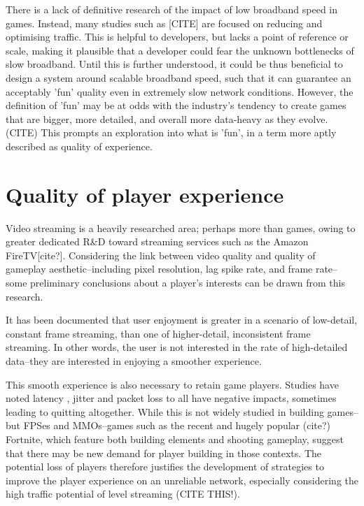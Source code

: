 \documentclass{scrartcl}
\begin{document}
There is a lack of definitive research of the impact of low broadband speed in games. Instead, many studies such as [CITE] are focused on reducing and optimising traffic. This is helpful to developers, but lacks a point of reference or scale, making it plausible that a developer could fear the unknown bottlenecks of slow broadband. Until this is further understood, it could be thus beneficial to design a system around scalable broadband speed, such that it can guarantee an acceptably 'fun' quality even in extremely slow network conditions. However, the definition of 'fun' may be at odds with the industry's tendency to create games that are bigger, more detailed, and overall more data-heavy as they evolve. (CITE) This prompts an exploration into what is 'fun', in a term more aptly described as quality of experience.

\section{Quality of player experience}
Video streaming is a heavily researched area; perhaps more than games, owing to greater dedicated R\&D toward streaming services such as the Amazon FireTV[cite?]. Considering the link between video quality and quality of gameplay aesthetic--including pixel resolution, lag spike rate, and frame rate--some preliminary conclusions about a player's interests can be drawn from this research.

It has been documented \cite{qoelargestudy} that user enjoyment is greater in a scenario of low-detail, constant frame streaming, than one of higher-detail, inconsistent frame streaming. In other words, the user is not interested in the rate of high-detailed data--they are interested in enjoying a smoother experience.

This smooth experience is also necessary to retain game players. Studies have noted latency \cite{qossensitivity} \cite{lagragequits}, jitter and packet loss \cite{lagragequits} to all have negative impacts, sometimes leading to quitting altogether. While this is not widely studied in building games--but FPSes and MMOs--games such as the recent and hugely popular (cite?) Fortnite, which feature both building elements and shooting gameplay, suggest that there may be new demand for player building in those contexts. The potential loss of players therefore justifies the development of strategies to improve the player experience on an unreliable network, especially considering the high traffic potential of level streaming (CITE THIS!).
\end{document}
